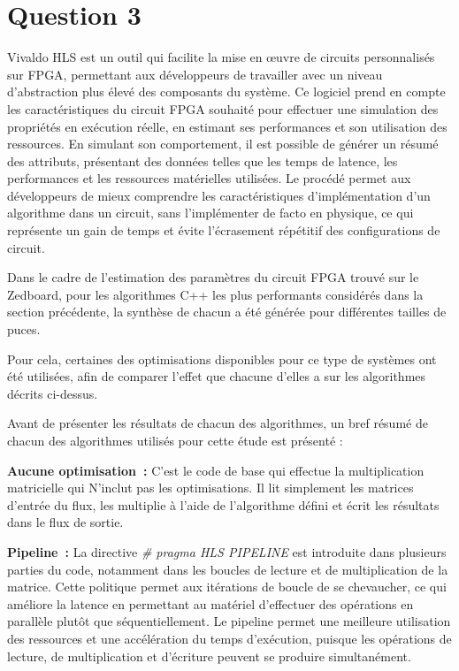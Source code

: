 \documentclass[../CSC_5RO06_TA.tex]{subfiles}
\begin{document}
\section*{Question 3}

Vivaldo HLS est un outil qui facilite la mise en œuvre de circuits personnalisés sur FPGA, permettant aux développeurs de travailler avec un niveau d'abstraction plus élevé des composants du système. Ce logiciel prend en compte les caractéristiques du circuit FPGA souhaité pour effectuer une simulation des propriétés en exécution réelle, en estimant ses performances et son utilisation des ressources. En simulant son comportement, il est possible de générer un résumé des attributs, présentant des données telles que les temps de latence, les performances et les ressources matérielles utilisées. Le procédé permet aux développeurs de mieux comprendre les caractéristiques d'implémentation d'un algorithme dans un circuit, sans l'implémenter de facto en physique, ce qui représente un gain de temps et évite l'écrasement répétitif des configurations de circuit.

Dans le cadre de l'estimation des paramètres du circuit FPGA trouvé sur le Zedboard, pour les algorithmes C++ les plus performants considérés dans la section précédente, la synthèse de chacun a été générée pour différentes tailles de puces.

Pour cela, certaines des optimisations disponibles pour ce type de systèmes ont été utilisées, afin de comparer l'effet que chacune d'elles a sur les algorithmes décrits ci-dessus.

Avant de présenter les résultats de chacun des algorithmes, un bref résumé de chacun des algorithmes utilisés pour cette étude est présenté :

\textbf{Aucune optimisation :}  C'est le code de base qui effectue la multiplication matricielle qui
 N'inclut pas les optimisations. Il lit simplement les matrices d'entrée du flux, les multiplie à l'aide de l'algorithme défini et écrit les résultats dans le flux de sortie.

\textbf{Pipeline :}  La directive \textit{\# pragma HLS PIPELINE} est introduite dans plusieurs parties du code, notamment dans les boucles de lecture et de multiplication de la matrice. Cette politique permet aux itérations de boucle de se chevaucher, ce qui améliore la latence en permettant au matériel d'effectuer des opérations en parallèle plutôt que séquentiellement. Le pipeline permet une meilleure utilisation des ressources et une accélération du temps d'exécution, puisque les opérations de lecture, de multiplication et d'écriture peuvent se produire simultanément.
\end{document}
